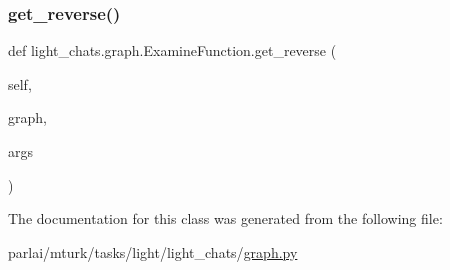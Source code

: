 \mbox{\label{classlight__chats_1_1graph_1_1ExamineFunction_ab489f99594157bdf84e8c67e7f9504bc}} 
\subsubsection{\texorpdfstring{get\+\_\+reverse()}{get\_reverse()}}
{\footnotesize\ttfamily def light\+\_\+chats.\+graph.\+Examine\+Function.\+get\+\_\+reverse (\begin{DoxyParamCaption}\item[{}]{self,  }\item[{}]{graph,  }\item[{}]{args }\end{DoxyParamCaption})}



The documentation for this class was generated from the following file\+:\begin{DoxyCompactItemize}
\item 
parlai/mturk/tasks/light/light\+\_\+chats/\hyperlink{parlai_2mturk_2tasks_2light_2light__chats_2graph_8py}{graph.\+py}\end{DoxyCompactItemize}
